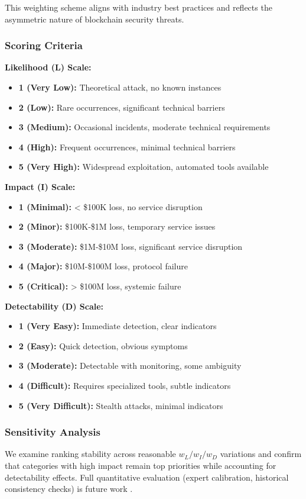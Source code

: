 This weighting scheme aligns with industry best practices and reflects the asymmetric nature of blockchain security threats.

\subsubsection{Scoring Criteria}
\textbf{Likelihood (L) Scale:}
\begin{itemize}
    \item \textbf{1 (Very Low):} Theoretical attack, no known instances
    \item \textbf{2 (Low):} Rare occurrences, significant technical barriers
    \item \textbf{3 (Medium):} Occasional incidents, moderate technical requirements
    \item \textbf{4 (High):} Frequent occurrences, minimal technical barriers
    \item \textbf{5 (Very High):} Widespread exploitation, automated tools available
\end{itemize}

\textbf{Impact (I) Scale:}
\begin{itemize}
    \item \textbf{1 (Minimal):} < \$100K loss, no service disruption
    \item \textbf{2 (Minor):} \$100K-\$1M loss, temporary service issues
    \item \textbf{3 (Moderate):} \$1M-\$10M loss, significant service disruption
    \item \textbf{4 (Major):} \$10M-\$100M loss, protocol failure
    \item \textbf{5 (Critical):} > \$100M loss, systemic failure
\end{itemize}

\textbf{Detectability (D) Scale:}
\begin{itemize}
    \item \textbf{1 (Very Easy):} Immediate detection, clear indicators
    \item \textbf{2 (Easy):} Quick detection, obvious symptoms
    \item \textbf{3 (Moderate):} Detectable with monitoring, some ambiguity
    \item \textbf{4 (Difficult):} Requires specialized tools, subtle indicators
    \item \textbf{5 (Very Difficult):} Stealth attacks, minimal indicators
\end{itemize}

\subsubsection{Sensitivity Analysis}
We examine ranking stability across reasonable $w_L/w_I/w_D$ variations and confirm that categories with high impact remain top priorities while accounting for detectability effects. Full quantitative evaluation (expert calibration, historical consistency checks) is future work \cite{FAIRCalibratedEstimation,ADICorrelation}.

